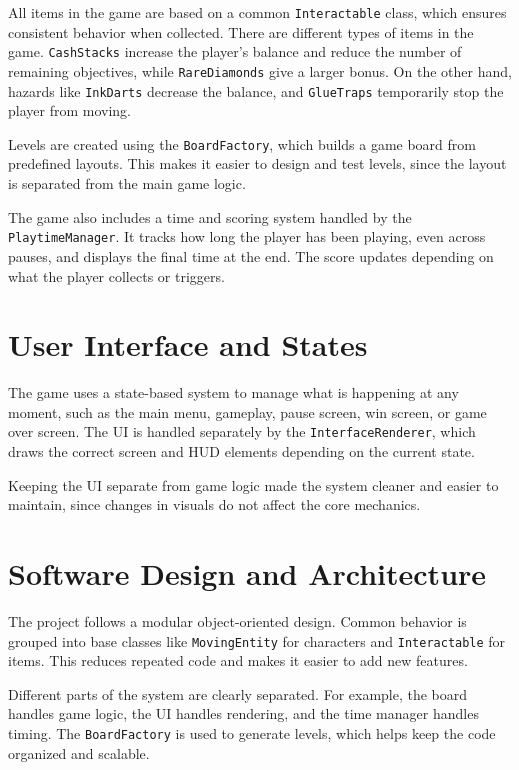 \documentclass[11pt]{article}
\begin{document}
All items in the game are based on a common \texttt{Interactable} class, which ensures consistent behavior when collected. There are different types of items in the game. \texttt{CashStacks} increase the player’s balance and reduce the number of remaining objectives, while \texttt{RareDiamonds} give a larger bonus. On the other hand, hazards like \texttt{InkDarts} decrease the balance, and \texttt{GlueTraps} temporarily stop the player from moving.

Levels are created using the \texttt{BoardFactory}, which builds a game board from predefined layouts. This makes it easier to design and test levels, since the layout is separated from the main game logic.

The game also includes a time and scoring system handled by the \texttt{PlaytimeManager}. It tracks how long the player has been playing, even across pauses, and displays the final time at the end. The score updates depending on what the player collects or triggers.

\section{User Interface and States}

The game uses a state-based system to manage what is happening at any moment, such as the main menu, gameplay, pause screen, win screen, or game over screen. The UI is handled separately by the \texttt{InterfaceRenderer}, which draws the correct screen and HUD elements depending on the current state.

Keeping the UI separate from game logic made the system cleaner and easier to maintain, since changes in visuals do not affect the core mechanics.

\section{Software Design and Architecture}

The project follows a modular object-oriented design. Common behavior is grouped into base classes like \texttt{MovingEntity} for characters and \texttt{Interactable} for items. This reduces repeated code and makes it easier to add new features.

Different parts of the system are clearly separated. For example, the board handles game logic, the UI handles rendering, and the time manager handles timing. The \texttt{BoardFactory} is used to generate levels, which helps keep the code organized and scalable.
\end{document}
